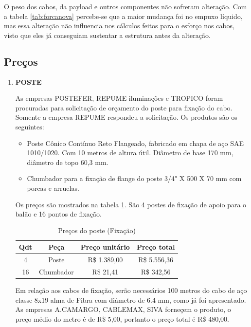 O peso dos cabos, da payload e outros componentes não sofreram alteração. Com a tabela \ref{tab:forcanova} percebe-se que a maior mudança foi no empuxo líquido, mas essa alteração não influencia nos cálculos feitos para o esforço nos cabos, visto que eles já conseguiam sustentar a estrutura antes da alteração.

\subsection{Preços}

\hspace{1cm}

\begin{enumerate}

	\item \textbf{POSTE}

		As empresas POSTEFER, REPUME iluminações e TROPICO foram procuradas para solicitação de orçamento do poste para fixação do cabo. Somente a empresa REPUME respondeu a solicitação. Os produtos são os seguintes:

		\begin{itemize}
			\item Poste Cônico Contínuo Reto Flangeado, fabricado em chapa de aço SAE 1010/1020. Com 10 metros de altura útil. Diâmetro de base 170 mm, diâmetro de topo 60,3 mm.
			\item Chumbador para a fixação de flange do poste 3/4" X 500 X 70 mm com porcas e arruelas.
		\end{itemize}

		Os preços são mostrados na tabela \ref{tab:precoposte}. São 4 postes de fixação de apoio para o balão e 16 pontos de fixação.

		\begin{table}[htp]
			\centering
			\caption{Preços do poste (Fixação)}
			\begin{tabular}{ | c | c | c | c |}
				\hline
				\textbf{Qdt} &\textbf{Peça} &\textbf{Preço unitário} &\textbf{Preço total}\\ \hline
				4 & Poste & R\$ 1.389,00 & R\$ 5.556,36 \\ \hline
				16 & Chumbador & R\$ 21,41 & R\$ 342,56 \\
				 \hline
			\end{tabular}
			\label{tab:precoposte}
		\end{table}

		Em relação aos cabos de fixação, serão necessários 100 metros do cabo de aço classe 8x19 alma de Fibra com diâmetro de 6.4 mm, como já foi apresentado. As empresas  A.CAMARGO, CABLEMAX,  SIVA forneçem o produto, o preço médio do metro é de  R\$ 5,00, portanto o preço total é R\$ 480,00.


\end{enumerate}
